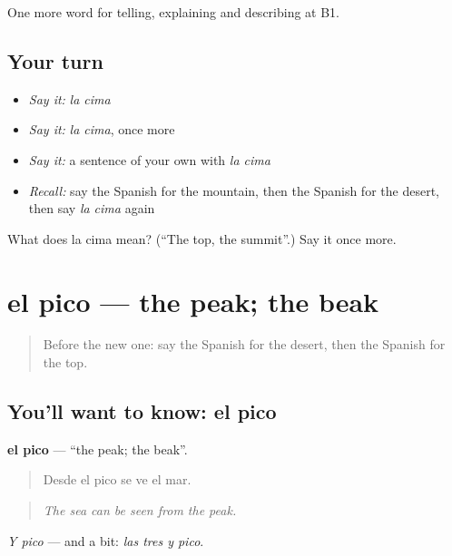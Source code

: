 \begin{grammarlens}[title={What you've built}]
One more word for telling, explaining and describing at B1.
\end{grammarlens}

\subsection*{Your turn}
\begin{itemize}
\raggedright
  \item \emph{Say it:} \emph{la cima}
  \item \emph{Say it:} \emph{la cima}, once more
  \item \emph{Say it:} a sentence of your own with \emph{la cima}
  \item \emph{Recall:} say the Spanish for the mountain, then the Spanish for the desert, then say \emph{la cima} again
\end{itemize}

\begin{tcolorbox}[breakable,colback=teal!4,colframe=teal!35!black,title={Before you move on}]
What does la cima mean? (\textquotedblleft{}The top, the summit\textquotedblright{}.) Say it once more.
\end{tcolorbox}
\section[el pico]{el pico — the peak; the beak}

\label{lesson:ES-C686-pico}



\begin{quote}
Before the new one: say the Spanish for the desert, then the Spanish for the top.
\end{quote}

\subsection*{You'll want to know: el pico}
\textbf{el pico} — \textquotedblleft{}the peak; the beak\textquotedblright{}.

\begin{quote}
Desde el pico se ve el mar.
\end{quote}

\begin{quote}
\emph{The sea can be seen from the peak.}
\end{quote}

\emph{Y pico} — and a bit: \emph{las tres y pico}.

